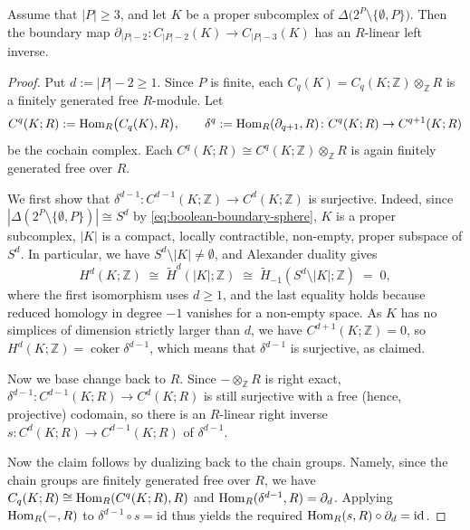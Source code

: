 \documentclass[a4paper,leqno]{amsart}
\begin{document}
\begin{lem}\label{lem:split-boundary-subset-chains}
Assume that $|P|\geq3$, and let $K$ be a proper subcomplex of
$\Delta\bigl(2^P\setminus\{\emptyset,P\}\bigr)$. Then the boundary map
$\partial_{|P|-2}:C_{|P|-2}(K)\longrightarrow C_{|P|-3}(K)$ has an $R$-linear left inverse. 
\end{lem}
\begin{proof}
Put $d:=|P|-2\ge 1$.   
Since $P$ is finite, each $C_q(K)=C_q(K;\mathbb Z)\otimes_{\mathbb Z}R$ is a finitely generated free $R$-module. 
Let
\[
  C^q(K;R):=\operatorname{Hom}_R\bigl(C_q(K),R\bigr),\qquad
  \delta^q:=\operatorname{Hom}_R(\partial_{q+1},R)\colon C^q(K;R)\to C^{q+1}(K;R)
\]
be the cochain complex.
Each $C^q(K;R)\cong C^q(K;\mathbb Z)\otimes_{\mathbb Z}R$ is again finitely generated free over $R$.

We first show that $\delta^{d-1}\colon C^{d-1}(K;\mathbb Z)\to C^{d}(K;\mathbb Z)$ is surjective.
Indeed, since $|\Delta(2^P\setminus\{\emptyset,P\})|\cong S^{d}$ by \eqref{eq:boolean-boundary-sphere}, $K$ is a
proper subcomplex, $|K|$ is a compact, locally contractible, non-empty, proper subspace of $S^d$.
In particular, we have $S^d\setminus|K|\neq\emptyset$, and Alexander duality \cite[Cor.~3.45]{Hat02} gives
\[
  H^{d}(K;\mathbb Z)\;\cong\;\widetilde H^{d}(|K|;\mathbb Z)\;\cong\;\widetilde H_{-1}(S^d\setminus|K|;\mathbb Z)\;=\;0,
\]
where the first isomorphism uses $d\ge1$, and the last equality holds because reduced homology in degree $-1$ vanishes for a non-empty space.
As $K$ has no simplices of dimension strictly larger than $d$, we have $C^{d+1}(K;\mathbb Z)=0$, so $H^d(K;\mathbb Z)=\operatorname{coker}\delta^{d-1}$, which means that $\delta^{d-1}$ is surjective, as claimed.

Now we base change back to $R$.
Since $-\otimes_{\mathbb Z}R$ is right exact, $\delta^{d-1}\colon C^{d-1}(K;R)\to C^d(K;R)$ is still surjective with a free (hence, projective) codomain, so there is an $R$-linear right inverse $s: C^d(K;R)\to C^{d-1}(K;R)$ of $\delta^{d-1}$.

Now the claim follows by dualizing back to the chain groups.
Namely, since the chain groups are finitely generated free over $R$, we have $C_q(K;R)\cong \operatorname{Hom}_R(C^q(K;R),R)$ and $\operatorname{Hom}_R(\delta^{d-1},R)=\partial_{d}$.  Applying $\operatorname{Hom}_R(-,R)$ to $\delta^{d-1}\circ s=\mathrm{id}$ thus yields the required 
$\operatorname{Hom}_R(s,R)\circ\partial_d=\mathrm{id}$.
\end{proof}
\end{document}
